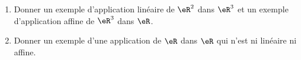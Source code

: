 \begin{exercice}\label{exodevoir2-0001}
  \begin{enumerate}
  \item Donner un exemple d'application linéaire de $\eR^2$ dans $\eR^3$ et un exemple d'application affine de $\eR^3$ dans $\eR$. 

  \item Donner un exemple d'une application de $\eR$ dans $\eR$ qui n'est ni linéaire ni affine.
  \end{enumerate}


\end{exercice}
